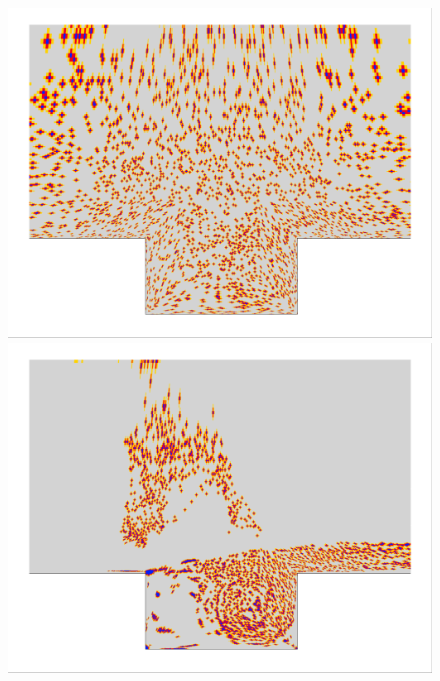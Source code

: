 \begin{figure}
	\begin{minipage}{0.49\linewidth}
		\includegraphics[width=0.99\linewidth,trim={0.5em 0.5em 0.5em 0.5em},clip]{Chapters/CavityAndCVRC/Images/cavity/deim/iBlank_random_zoom.png}
	\end{minipage}
	\begin{minipage}{0.49\linewidth}
		\includegraphics[width=0.99\linewidth,trim={0.5em 0.5em 0.5em 0.5em},clip]{Chapters/CavityAndCVRC/Images/cavity/deim/iBlank_eigenvec_zoom.png}
	\end{minipage}


\end{figure}
